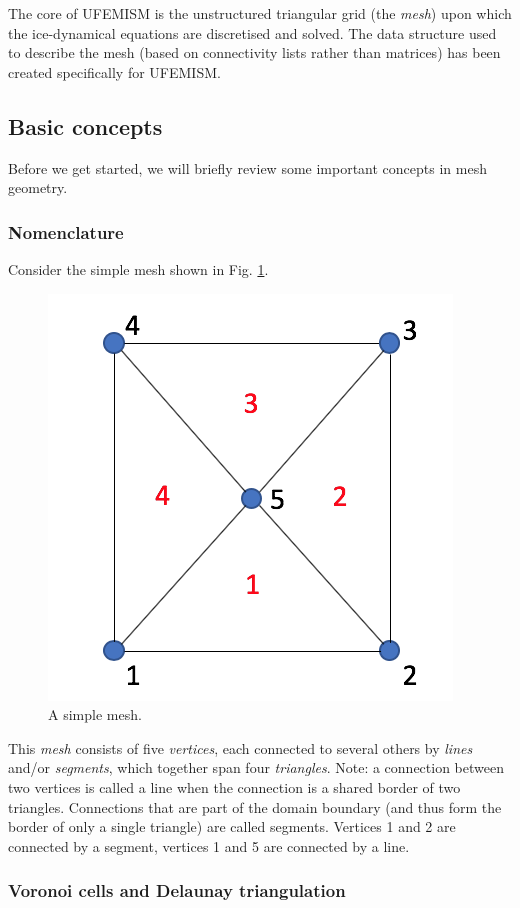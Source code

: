 \documentclass{article}
\begin{document}
The core of UFEMISM is the unstructured triangular grid (the \emph{mesh}) upon which the ice-dynamical equations are discretised and solved. The data structure used
to describe the mesh (based on connectivity lists rather than matrices) has been created specifically for UFEMISM.

\subsection{Basic concepts}

Before we get started, we will briefly review some important concepts in mesh geometry.

\subsubsection{Nomenclature}

Consider the simple mesh shown in Fig. \ref{fig:dummymesh}.

\begin{figure}[h!] \label{fig:dummymesh}
  \includegraphics[width=0.3\linewidth]{Fig_dummymesh_02.png}
  \caption{A simple mesh.}
\end{figure}

This \emph{mesh} consists of five \emph{vertices}, each connected to several others by \emph{lines} and/or \emph{segments}, which together span four \emph{triangles}. Note: a connection between two vertices is called a line when the connection is a shared border of two triangles. Connections that are part of the domain boundary (and thus form the border of only a single triangle) are called segments. Vertices 1 and 2 are connected by a segment, vertices 1 and 5 are connected by a line.

\subsubsection{Voronoi cells and Delaunay triangulation}
\end{document}
